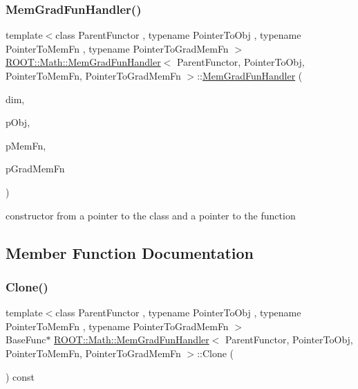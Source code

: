 \subsubsection{\texorpdfstring{MemGradFunHandler()}{MemGradFunHandler()}\hspace{0.1cm}{\footnotesize\ttfamily [4/4]}}
{\footnotesize\ttfamily template$<$class Parent\+Functor , typename Pointer\+To\+Obj , typename Pointer\+To\+Mem\+Fn , typename Pointer\+To\+Grad\+Mem\+Fn $>$ \\
\mbox{\hyperlink{classROOT_1_1Math_1_1MemGradFunHandler}{R\+O\+O\+T\+::\+Math\+::\+Mem\+Grad\+Fun\+Handler}}$<$ Parent\+Functor, Pointer\+To\+Obj, Pointer\+To\+Mem\+Fn, Pointer\+To\+Grad\+Mem\+Fn $>$\+::\mbox{\hyperlink{classROOT_1_1Math_1_1MemGradFunHandler}{Mem\+Grad\+Fun\+Handler}} (\begin{DoxyParamCaption}\item[{unsigned int}]{dim,  }\item[{const Pointer\+To\+Obj \&}]{p\+Obj,  }\item[{Pointer\+To\+Mem\+Fn}]{p\+Mem\+Fn,  }\item[{Pointer\+To\+Grad\+Mem\+Fn}]{p\+Grad\+Mem\+Fn }\end{DoxyParamCaption})\hspace{0.3cm}{\ttfamily [inline]}}



constructor from a pointer to the class and a pointer to the function 



\subsection{Member Function Documentation}
\mbox{\label{classROOT_1_1Math_1_1MemGradFunHandler_a987e3b1a8492990c3c2a5c3eca9964a6}} 
\subsubsection{\texorpdfstring{Clone()}{Clone()}\hspace{0.1cm}{\footnotesize\ttfamily [1/2]}}
{\footnotesize\ttfamily template$<$class Parent\+Functor , typename Pointer\+To\+Obj , typename Pointer\+To\+Mem\+Fn , typename Pointer\+To\+Grad\+Mem\+Fn $>$ \\
Base\+Func$\ast$ \mbox{\hyperlink{classROOT_1_1Math_1_1MemGradFunHandler}{R\+O\+O\+T\+::\+Math\+::\+Mem\+Grad\+Fun\+Handler}}$<$ Parent\+Functor, Pointer\+To\+Obj, Pointer\+To\+Mem\+Fn, Pointer\+To\+Grad\+Mem\+Fn $>$\+::Clone (\begin{DoxyParamCaption}{ }\end{DoxyParamCaption}) const\hspace{0.3cm}{\ttfamily [inline]}}

